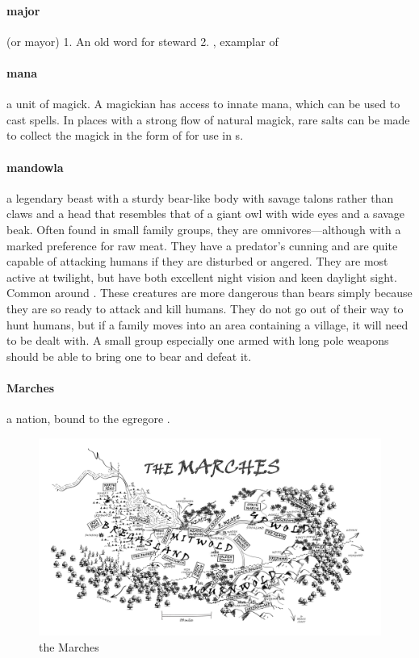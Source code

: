 \paragraph{major} (or mayor) 1. An old  word for steward 2. , examplar of 
\paragraph{mana} a unit of magick. A magickian has access to innate mana, which can be used to cast spells. In places with a strong flow of natural magick, rare salts can be made to collect the magick in the form of  for use in s.
\paragraph{mandowla} a legendary beast with a sturdy bear-like body with savage talons rather than claws and a head that resembles that of a giant owl with wide eyes and a savage beak. Often found in small family groups, they are omnivores—although with a marked preference for raw meat. They have a predator's cunning and are quite capable of attacking humans if they are disturbed or angered. They are most active at twilight, but have both excellent night vision and keen daylight sight. Common around . These creatures are more dangerous than bears simply because they are so ready to attack and kill humans. They do not go out of their way to hunt humans, but if a family moves into an area containing a village, it will need to be dealt with. A small group especially one armed with long pole weapons should be able to bring one to bear and defeat it.
\paragraph{Marches} a nation, bound to the egregore . \begin{figure}\centering\includegraphics[width=1.1\textwidth]{encyclopedia/marches}\caption{the Marches}\end{figure}
